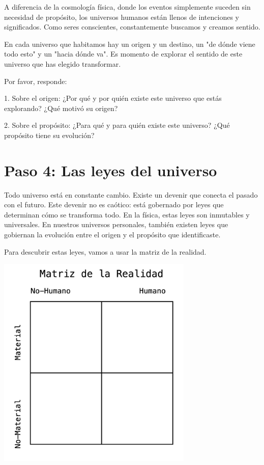 \documentclass[statementpaper,oneside,article,10pt]{memoir}
\begin{document}
A diferencia de la cosmología física, donde los eventos simplemente suceden sin necesidad de propósito, los universos humanos están llenos de intenciones y significados. Como seres conscientes, constantemente buscamos y creamos sentido.

En cada universo que habitamos hay un origen y un destino, un "de dónde viene todo esto" y un "hacia dónde va". Es momento de explorar el sentido de este universo que has elegido transformar.

Por favor, responde:

1. Sobre el origen:
¿Por qué y por quién existe este universo que estás explorando?  ¿Qué motivó su origen?
\vspace{5cm}

2. Sobre el propósito:
¿Para qué y para quién existe este universo? ¿Qué propósito tiene su evolución?
\vspace{5cm}


\newpage
\section{Paso 4: Las leyes del universo}
Todo universo está en constante cambio. Existe un devenir que conecta el pasado con el futuro.  Este devenir no es caótico: está gobernado por leyes que determinan cómo se transforma todo. En la física, estas leyes son inmutables y universales. En nuestros universos personales, también existen leyes que gobiernan la evolución entre el origen y el propósito que identificaste.

Para descubrir estas leyes, vamos a usar la matriz de la realidad. 

\begin{center}
\includegraphics[width=0.7\textwidth]{matriz.png}
\end{center}
\end{document}
